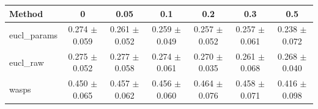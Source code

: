 \begin{table}[htbp]
\centering
\begin{NiceTabular}{lcccccc}
\toprule
Method & 0 & 0.05 & 0.1 & 0.2 & 0.3 & 0.5 \\
\midrule
eucl\_params & 0.274 $\pm$ 0.059 & 0.261 $\pm$ 0.052 & 0.259 $\pm$ 0.049 & 0.257 $\pm$ 0.052 & 0.257 $\pm$ 0.061 & 0.238 $\pm$ 0.072 \\
eucl\_raw & 0.275 $\pm$ 0.052 & 0.277 $\pm$ 0.058 & 0.274 $\pm$ 0.061 & 0.270 $\pm$ 0.035 & 0.261 $\pm$ 0.068 & 0.268 $\pm$ 0.040 \\
wasps & 0.450 $\pm$ 0.065 & 0.457 $\pm$ 0.062 & 0.456 $\pm$ 0.060 & 0.464 $\pm$ 0.076 & 0.458 $\pm$ 0.071 & 0.416 $\pm$ 0.098 \\
\bottomrule
\end{NiceTabular}
\label{tab:sens_river_decimation_barycenter}
\end{table}
